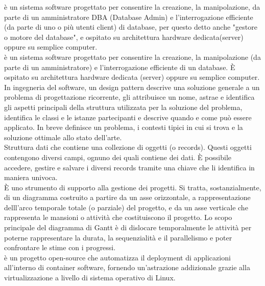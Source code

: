 \documentclass{scalatekids-article}
\begin{document}
 è un sistema software progettato per consentire la creazione, la manipolazione, da parte di un amministratore DBA (Database Admin) e l'interrogazione efficiente (da parte di uno o più utenti client) di database, per questo detto anche "gestore o motore del database", e ospitato su architettura hardware dedicata(server) oppure su semplice computer.
\\

 è un sistema software progettato per consentire la creazione, la manipolazione (da parte di un amministratore) e l'interrogazione efficiente di un database.
È ospitato su architettura hardware dedicata (server) oppure su semplice computer.
\\

 In ingegneria del software, un design pattern descrive una soluzione generale a un problema di progettazione ricorrente, gli attribuisce un nome, astrae e identifica gli aspetti principali della struttura utilizzata per la soluzione del problema, identifica le classi e le istanze partecipanti e descrive quando e come può essere applicato. In breve definisce un problema, i contesti tipici in cui si trova e la soluzione ottimale allo stato dell'arte.
\\

 Struttura dati che contiene una collezione di oggetti (o records).
Questi oggetti contengono diversi campi, ognuno dei quali contiene dei dati.
È possibile accedere, gestire e salvare i diversi records tramite una chiave che li identifica in maniera univoca.
\\

 È uno strumento di supporto alla gestione dei progetti.
Si tratta, sostanzialmente, di un diagramma costruito a partire da un asse orizzontale, a rappresentazione delll'arco temporale totale (o parziale) del progetto, e da un asse verticale che rappresenta le mansioni o attività che costituiscono il progetto.
Lo scopo principale del diagramma di Gantt è di dislocare temporalmente le attività per poterne rappresentare la durata, la sequenzialità e il parallelismo e poter confrontare le stime con i progressi.
\\

 è un progetto open-source che automatizza il deployment di applicazioni all'interno di container software, fornendo un'astrazione addizionale grazie alla virtualizzazione a livello di sistema operativo di Linux.
\\
\end{document}
